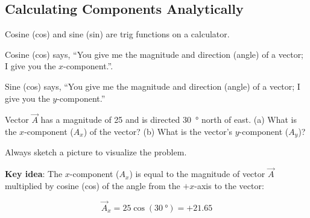 \documentclass{article}
\begin{document}
\subsection{Calculating Components Analytically}

Cosine (cos) and sine (sin) are trig functions on a calculator.

Cosine (cos) says, ``You give me the magnitude and direction (angle) of a vector; I give you the $x$-component.''.

Sine (cos) says, ``You give me the magnitude and direction (angle) of a vector; I give you the $y$-component.''

\begin{example}
    Vector $\vec{A}$ has a magnitude of 25 and is directed \SI{30}{\degree} north of east. (a) What is the $x$-component ($A_x$) of the vector? (b) What is the vector's $y$-component ($A_y$)?
\end{example}

\Solution Always sketch a picture to visualize the problem.

\begin{figure}[h!]
    \centering
\def\A{5}
\def\angle{30}
\end{figure}

\textbf{Key idea}: The $x$-component ($A_x$) is equal to the magnitude of vector $\vec{A}$ multiplied by cosine (cos) of the angle from the $+x$-axis to the vector:

\begin{equation*}
    \vec{A}_x = 25 \cos{(\SI{30}{\degree})} = +21.65
\end{equation*}
\end{document}
